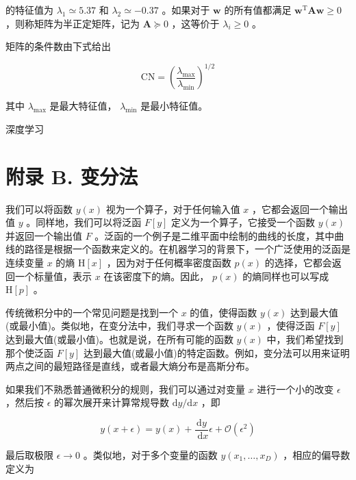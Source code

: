 \documentclass[10pt]{report}
\begin{document}
的特征值为 \({\lambda }_{1} \simeq  {5.37}\) 和 \({\lambda }_{2} \simeq   - {0.37}\) 。如果对于 \(\mathbf{w}\) 的所有值都满足 \({\mathbf{w}}^{\mathrm{T}}\mathbf{{Aw}} \geq  0\) ，则称矩阵为半正定矩阵，记为 \(\mathbf{A} \succcurlyeq  0\) ，这等价于 \({\lambda }_{i} \geq  0\) 。

矩阵的条件数由下式给出

\[
\mathrm{{CN}} = {\left( \frac{{\lambda }_{\max }}{{\lambda }_{\min }}\right) }^{1/2} \tag{A.50}
\]

其中 \({\lambda }_{\max }\) 是最大特征值， \({\lambda }_{\min }\) 是最小特征值。

深度学习

\section*{附录 B. 变分法}

我们可以将函数 \(y\left( x\right)\) 视为一个算子，对于任何输入值 \(x\) ，它都会返回一个输出值 \(y\) 。同样地，我们可以将泛函 \(F\left\lbrack  y\right\rbrack\) 定义为一个算子，它接受一个函数 \(y\left( x\right)\) 并返回一个输出值 \(F\) 。泛函的一个例子是二维平面中绘制的曲线的长度，其中曲线的路径是根据一个函数来定义的。在机器学习的背景下，一个广泛使用的泛函是连续变量 \(x\) 的熵 \(\mathrm{H}\left\lbrack  x\right\rbrack\) ，因为对于任何概率密度函数 \(p\left( x\right)\) 的选择，它都会返回一个标量值，表示 \(x\) 在该密度下的熵。因此， \(p\left( x\right)\) 的熵同样也可以写成 \(\mathrm{H}\left\lbrack  p\right\rbrack\) 。

传统微积分中的一个常见问题是找到一个 \(x\) 的值，使得函数 \(y\left( x\right)\) 达到最大值(或最小值)。类似地，在变分法中，我们寻求一个函数 \(y\left( x\right)\) ，使得泛函 \(F\left\lbrack  y\right\rbrack\) 达到最大值(或最小值)。也就是说，在所有可能的函数 \(y\left( x\right)\) 中，我们希望找到那个使泛函 \(F\left\lbrack  y\right\rbrack\) 达到最大值(或最小值)的特定函数。例如，变分法可以用来证明两点之间的最短路径是直线，或者最大熵分布是高斯分布。

如果我们不熟悉普通微积分的规则，我们可以通过对变量 \(x\) 进行一个小的改变 \(\epsilon\) ，然后按 \(\epsilon\) 的幂次展开来计算常规导数 \(\mathrm{d}y/\mathrm{d}x\) ，即

\[
y\left( {x + \epsilon }\right)  = y\left( x\right)  + \frac{\mathrm{d}y}{\mathrm{\;d}x}\epsilon  + \mathcal{O}\left( {\epsilon }^{2}\right)  \tag{B.1}
\]

最后取极限 \(\epsilon  \rightarrow  0\) 。类似地，对于多个变量的函数 \(y\left( {{x}_{1},\ldots ,{x}_{D}}\right)\) ，相应的偏导数定义为
\end{document}

